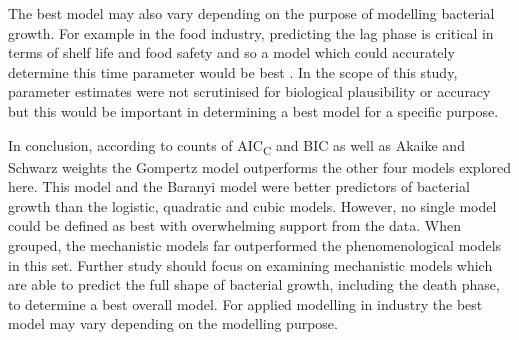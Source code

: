 \documentclass[11pt]{article}
\begin{document}
\begin{linenumbers}
        The best model may also vary depending on the purpose of modelling bacterial growth. For example in the food industry, predicting the lag phase is critical in terms of shelf life and food safety and so a model which could accurately determine this time parameter would be best \citep{ross_modeling_2003, mahdinia_microbial_2020}. In the scope of this study, parameter estimates were not scrutinised for biological plausibility or accuracy but this would be important in determining a best model for a specific purpose. 
        
        In conclusion, according to counts of AIC\textsubscript{C} and BIC as well as Akaike and Schwarz weights the Gompertz model outperforms the other four models explored here. This model and the Baranyi model were better predictors of bacterial growth than the logistic, quadratic and cubic models. However, no single model could be defined as best with overwhelming support from the data. When grouped, the mechanistic models far outperformed the phenomenological models in this set. Further study should focus on examining mechanistic models which are able to predict the full shape of bacterial growth, including the death phase, to determine a best overall model. For applied modelling in industry the best model may vary depending on the modelling purpose.

    
    
    
    
    
    \end{linenumbers}
\end{document}
